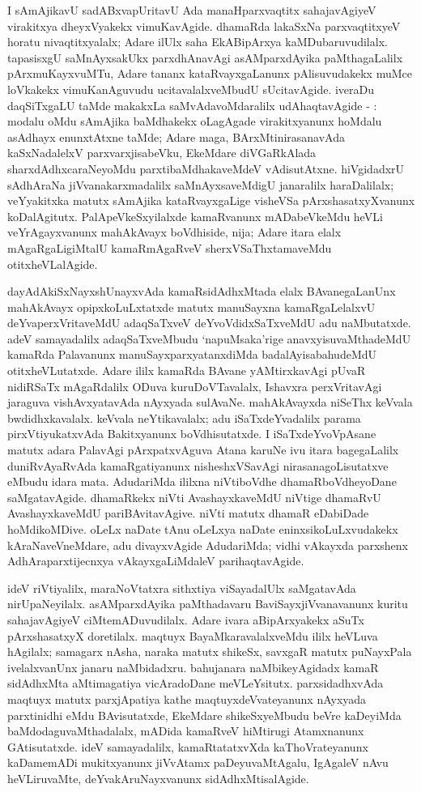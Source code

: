 I sAmAjikavU sadABxvapUritavU Ada manaHparxvaqtitx sahajavAgiyeV vira\-kitxya dheyxVyakekx vimuKavAgide. dhamaRda lakaSxNa parxvaqtitxyeV horatu nivaqtitxyalalx; Adare ilUlx saha EkABipArxya kaMDubaruvudilalx. tapasisxgU saMnAyxsakUkx parxdhAnavAgi asAMparxdAyika paMthagaLalilx pArxmuKayxvuMTu, Adare tananx kataRvayxgaLanunx pAlisuvu\-dakekx muMce loVkakekx vimuKanAguvudu ucitavalalxveMbudU sUcitavAgide. iveraDu daqSiTxgaLU taMde makakxLa saMvAdavoMdaralilx udAhaqtavAgide - : modalu oMdu sAmAjika baMdhakekx oLagAgade virakitxyanunx hoMdalu asAdhayx enunxtAtxne taMde; Adare maga, BArxMtinirasanavAda kaSxNadalelxV parxvarxjisabeVku, EkeMdare diVGaRkAlada sharxdAdhxcaraNeyoMdu parxtibaMdhakaveMdeV vAdisutAtxne. hiVgidadxrU sAdhAraNa jiVvanakarxmadalilx saMnAyxsaveMdigU janaralilx haraDalilalx; veYyakitxka matutx sAmAjika kataRvayxgaLige visheVSa pArxshasatxyXvanunx koDalAgitutx. PalApeVkeSxyilalxde kamaRvanunx mADabeVkeMdu heVLi veYrAgayxvanunx mahAkAvayx boVdhiside, nija; Adare itara elalx mAgaRgaLigiMtalU kamaRmAgaRveV sherxVSaThxtamaveMdu otitxheVLalAgide.

dayAdAkiSxNayxshUnayxvAda kamaRsidAdhxMtada elalx BAvanegaLanUnx mahAkAvayx opipxkoLuLxtatxde matutx manuSayxna kamaRgaLelalxvU deYvaperxVritaveMdU adaqSaTxveV deYvoVdidxSaTxveMdU adu naMbutatxde. adeV samayadalilx adaqSaTxveMbudu `napuMsaka'rige anavxyisuvaMthadeMdU kamaRda Palavanunx manuSayxparxyatanxdiMda badalAyisabahudeMdU otitxheVLutatxde. Adare ililx kamaRda BAvane yAMtirxkavAgi pUvaR nidiRSaTx mAgaRdalilx ODuva kuruDoVTavalalx, Ishavxra perxVritavAgi jaraguva vishAvxyatavAda nAyxyada sulAvaNe. mahAkAvayxda niSeThx keVvala bwdidhxkavalalx. keVvala neYtikavalalx; adu iSaTxdeYvadalilx parama pirxVtiyukatxvAda Bakitxyanunx boVdhisutatxde. I iSaTxdeYvoVpAsane matutx adara PalavAgi pArxpatxvAguva Atana karuNe ivu itara bagegaLalilx duniRvAyaRvAda kamaRgatiyanunx nisheshxVSavAgi nirasanagoLisutatxve eMbudu idara mata. AdudariMda ililxna niVtiboVdhe dhamaRboVdheyoDane saMgatavAgide. dhamaRkekx niVti AvashayxkaveMdU niVtige dhamaRvU AvashayxkaveMdU pariBAvitavAgive. niVti matutx dhamaR eDabiDade hoMdikoMDive. oLeLx naDate tAnu oLeLxya naDate eninxsikoLuLxvudakekx kAraNaveVneMdare, adu divayxvAgide AdudariMda; vidhi vAkayxda parxshenx AdhAraparxtijecnxya vAkayxgaLiMdaleV parihaqtavAgide.

ideV riVtiyalilx, maraNoVtatxra sithxtiya viSayadalUlx saMgatavAda nirUpaNe\-yilalx. asAMparxdAyika paMthadavaru BaviSayxjiVvanavanunx kuritu sahajavAgiyeV ciMtemADuvudilalx. Adare ivara aBipArxyakekx aSuTx pArxshasatxyX doretilalx. maqtuyx BayaMkaravalalxveMdu ililx heVLuva hAgilalx; samagarx nAsha, naraka matutx shikeSx, savxgaR matutx puNayxPala ivelalxvanUnx janaru naMbidadxru. bahujanara naMbikeyAgidadx kamaR sidAdhxMta aMtimagatiya vicAradoDane meVLeYsitutx. parxsidadhxvAda maqtuyx matutx parxjApatiya kathe  maqtuyxdeVvateyanunx nAyxyada parxtinidhi eMdu BAvisutatxde, EkeMdare shikeSxyeMbudu beVre kaDeyiMda baMdodaguvaMthadalalx, mADida kamaRveV hiMtirugi Atamxnanunx GAtisutatxde. ideV samayadalilx, kamaRtatatxvXda kaThoVrateyanunx kaDamemADi mukitxyanunx jiVvAtamx paDeyuvaMtAgalu, IgAgaleV nAvu heVLiruvaMte, deYvakAruNayxvanunx sidAdhxMtisalAgide.

